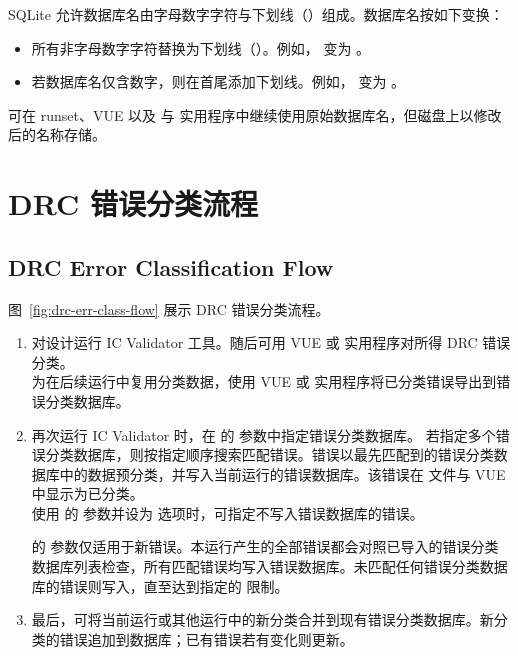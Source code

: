SQLite 允许数据库名由字母数字字符与下划线（\cmd{\_}）组成。数据库名按如下变换：
\begin{itemize}
  \item 所有非字母数字字符替换为下划线（\cmd{\_}）。例如， 变为 。
  \item 若数据库名仅含数字，则在首尾添加下划线。例如， 变为 。
\end{itemize}

可在 runset、VUE 以及  与  实用程序中继续使用原始数据库名，但磁盘上以修改后的名称存储。

\section{DRC 错误分类流程}
\subsection*{DRC Error Classification Flow}

图~\ref{fig:drc-err-class-flow} 展示 DRC 错误分类流程。


\begin{enumerate}
  \item 对设计运行 IC Validator 工具。随后可用 VUE 或  实用程序对所得 DRC 错误分类。\\
    为在后续运行中复用分类数据，使用 VUE 或  实用程序将已分类错误导出到错误分类数据库。
  \item 再次运行 IC Validator 时，在  的  参数中指定错误分类数据库。
    若指定多个错误分类数据库，则按指定顺序搜索匹配错误。错误以最先匹配到的错误分类数据库中的数据预分类，并写入当前运行的错误数据库。该错误在  文件与 VUE 中显示为已分类。\\
    使用  的  参数并设为  选项时，可指定不写入错误数据库的错误。
\begin{noteBox}
 的  参数仅适用于新错误。本运行产生的全部错误都会对照已导入的错误分类数据库列表检查，所有匹配错误均写入错误数据库。未匹配任何错误分类数据库的错误则写入，直至达到指定的  限制。
\end{noteBox}
  \item 最后，可将当前运行或其他运行中的新分类合并到现有错误分类数据库。新分类的错误追加到数据库；已有错误若有变化则更新。
\end{enumerate}

